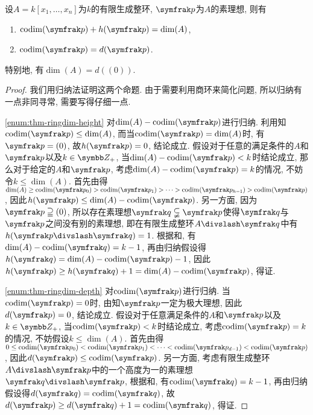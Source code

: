\begin{theorem}\label{thm:ringdim}
  设$A=k[x_1, \dotsc, x_n]$为$k$的有限生成整环, $\ideal{p}$为$A$的素理想, 则有
  \begin{enumerate}
    \item\label{enum:thm-ringdim-height} $\codim(\ideal{p})+h(\ideal{p})=\dim (A)$,
    \item\label{enum:thm-ringdim-depth} $\codim(\ideal{p})=d(\ideal{p})$.
  \end{enumerate}
  特别地, 有$\dim (A) = d((0))$.
\end{theorem}

\begin{proof}
  我们用归纳法证明这两个命题. 由于需要利用商环来简化问题, 所以归纳有一点非同寻常, 需要写得仔细一点.

  \ref{enum:thm-ringdim-height} 对$\dim (A)-\codim (\ideal{p})$进行归纳. 利用知$\codim (\ideal{p})\leq \dim (A)$, 而当$\codim (\ideal{p})=\dim (A)$时, 有$\ideal{p}=(0)$, 故$h(\ideal{p})=0$, 结论成立. 假设对于任意的满足条件的$A$和$\ideal{p}$以及$k\in\ZZ_+$, 当$\dim (A)-\codim (\ideal{p})< k$时结论成立, 那么对于给定的$A$和$\ideal{p}$, 考虑$\dim (A)-\codim (\ideal{p})=k$的情况, 不妨令$k\leq \dim (A)$. 首先由得$\dim (A)\geq\codim (\ideal{p}_0)>\codim (\ideal{p}_1)>\dotsb >\codim (\ideal{p}_{h-1})>\codim (\ideal{p})$, 因此$h(\ideal{p})\leq \dim (A)-\codim (\ideal{p})$. 另一方面, 因为$\ideal{p}\supseteqq (0)$, 所以存在素理想$\ideal{q}\subsetneqq \ideal{p}$使得$\ideal{q}$与$\ideal{p}$之间没有别的素理想, 即在有限生成整环$A{\divslash}\ideal{q}$中有$h(\ideal{p}{\divslash}\ideal{q})=1$. 根据和, 有$\dim (A)-\codim (\ideal{q})=k-1$, 再由归纳假设得$h(\ideal{q})=\dim (A)-\codim (\ideal{p})-1$, 因此$h(\ideal{p})\geq h(\ideal{q})+1 = \dim (A)-\codim (\ideal{p})$, 得证.

  \ref{enum:thm-ringdim-depth} 对$\codim (\ideal{p})$进行归纳. 当$\codim (\ideal{p})=0$时, 由知$\ideal{p}$一定为极大理想, 因此$d(\ideal{p})=0$, 结论成立. 假设对于任意满足条件的$A$和$\ideal{p}$以及$k\in\ZZ_+$, 当$\codim(\ideal{p})<k$时结论成立, 考虑$\codim(\ideal{p})=k$的情况, 不妨假设$k\leq \dim (A)$. 首先由得 $0\leq\codim (\ideal{p}_0)<\codim (\ideal{p}_1)<\dotsb <\codim (\ideal{p}_{d-1})<\codim (\ideal{p})$, 因此$d(\ideal{p})\leq \codim (\ideal{p})$. 另一方面, 考虑有限生成整环$A{\divslash}\ideal{p}$中的一个高度为一的素理想$\ideal{q}{\divslash}\ideal{p}$, 根据和, 有$\codim (\ideal{q})=k-1$, 再由归纳假设得$d(\ideal{q})=\codim (\ideal{q})$, 故$d(\ideal{p})\geq d(\ideal{q})+1=\codim (\ideal{q})$, 得证.
\end{proof}

